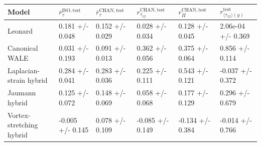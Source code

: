 \begin{tabular}{llllll}
\toprule
Model & $\overline{r}_{\tau}^{\mathrm{ISO,test}}$ & $\overline{r}_{\tau}^{\mathrm{CHAN,test}}$ & $r_{\tau_{12}}^{\mathrm{CHAN,test}}$ & $r_{\Pi}^{\mathrm{CHAN,test}}$ & $r_{\langle \tau_{12} \rangle (y)}^{\mathrm{test}}$ \\
\midrule
Leonard & 0.181 +/- 0.048 & 0.152 +/- 0.029 & 0.028 +/- 0.034 & 0.128 +/- 0.045 & 2.06e-04 +/- 0.369 \\
Canonical WALE & 0.031 +/- 0.193 & 0.091 +/- 0.013 & 0.362 +/- 0.056 & 0.375 +/- 0.064 & 0.856 +/- 0.114 \\
Laplacian-strain hybrid & 0.284 +/- 0.041 & 0.283 +/- 0.036 & 0.225 +/- 0.111 & 0.543 +/- 0.121 & -0.037 +/- 0.372 \\
Jaumann hybrid & 0.125 +/- 0.072 & 0.148 +/- 0.069 & 0.058 +/- 0.068 & 0.177 +/- 0.129 & 0.296 +/- 0.679 \\
Vortex-stretching hybrid & -0.005 +/- 0.145 & 0.078 +/- 0.109 & -0.085 +/- 0.149 & -0.134 +/- 0.384 & -0.014 +/- 0.766 \\
\bottomrule
\end{tabular}
